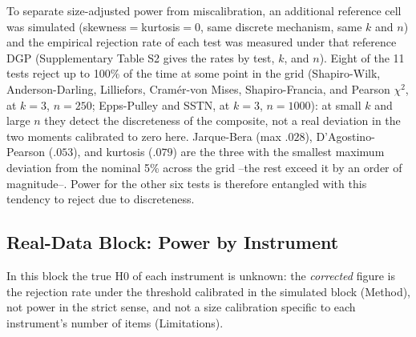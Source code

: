\documentclass[man,mask,donotrepeattitle,floatsintext]{apa7}
\begin{document}
To separate size-adjusted power from miscalibration, an additional reference cell was simulated (skewness$=$kurtosis$=0$, same discrete mechanism, same $k$ and $n$) and the empirical rejection rate of each test was measured under that reference DGP (Supplementary Table S2 gives the rates by test, $k$, and $n$). Eight of the 11 tests reject up to 100\% of the time at some point in the grid (Shapiro-Wilk, Anderson-Darling, Lilliefors, Cramér-von Mises, Shapiro-Francia, and Pearson $\chi^2$, at $k=3$, $n=250$; Epps-Pulley and SSTN, at $k=3$, $n=1000$): at small $k$ and large $n$ they detect the discreteness of the composite, not a real deviation in the two moments calibrated to zero here. Jarque-Bera (max $.028$), D'Agostino-Pearson ($.053$), and kurtosis ($.079$) are the three with the smallest maximum deviation from the nominal 5\% across the grid --the rest exceed it by an order of magnitude--. Power for the other six tests is therefore entangled with this tendency to reject due to discreteness.

\subsection{Real-Data Block: Power by Instrument}
\label{sec:res-real}

In this block the true H0 of each instrument is unknown: the \emph{corrected} figure is the rejection rate under the threshold calibrated in the simulated block (Method), not power in the strict sense, and not a size calibration specific to each instrument's number of items (Limitations).
\end{document}
